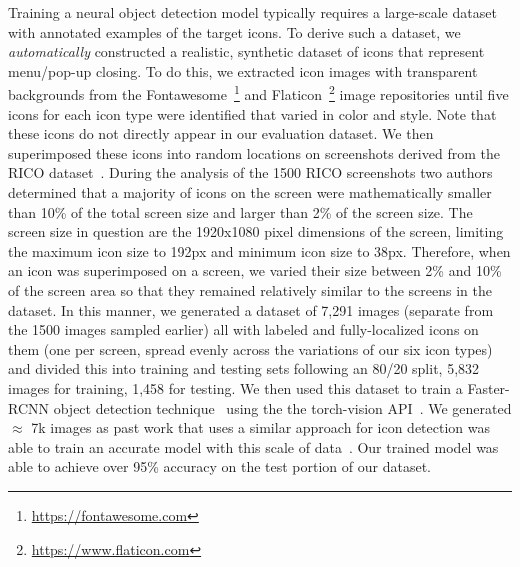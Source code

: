 Training a neural object detection model typically requires a large-scale dataset with annotated examples of the target icons. To derive such a dataset, we \textit{automatically} constructed a realistic, synthetic dataset of icons that represent menu/pop-up closing. To do this, we extracted icon images with transparent backgrounds from the Fontawesome~\footnote{\url{https://fontawesome.com}} and Flaticon~\footnote{\url{https://www.flaticon.com}} image repositories until five icons for each icon type were identified that varied in color and style. Note that these icons do not directly appear in our evaluation dataset. We then superimposed these icons into random locations on screenshots derived from the RICO dataset~\cite{Deka:UIST'17}. During the analysis of the 1500 RICO screenshots two authors determined that a majority of icons on the screen were mathematically smaller than 10\% of the total screen size and larger than 2\% of the screen size. The screen size in question are the 1920x1080 pixel dimensions of the screen, limiting the maximum icon size to 192px and minimum icon size to 38px. Therefore, when an icon was superimposed on a screen, we varied their size between 2\% and 10\% of the screen area so that they remained relatively similar to the screens in the dataset. In this manner, we generated a dataset of 7,291 images (separate from the 1500 images sampled earlier) all with labeled and fully-localized icons on them (one per screen, spread evenly across the variations of our six icon types) and divided this into training and testing sets following an 80/20 split, 5,832 images for training, 1,458 for testing. We then used this dataset to train a Faster-RCNN object detection technique~\cite{ren2015faster} using the the torch-vision API~\cite{torchvision}. We generated $\approx$ 7k images as past work that uses a similar approach for icon detection was able to train an accurate model with this scale of data~\cite{Cardenas:ICSE'20,Cardenas:TSE23,Havranek:ICSE'21}. Our trained model was able to achieve over 95\% accuracy on the test portion of our dataset. 



